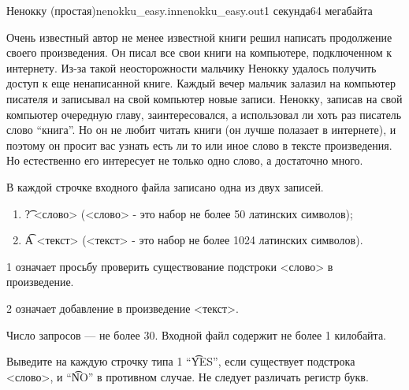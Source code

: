 
\begin{problem}{Ненокку (простая)}{nenokku\_easy.in}{nenokku\_easy.out}{1 секунда}{64 мегабайта}

Очень известный автор не менее известной книги решил написать 
продолжение своего произведения. 
Он писал все свои книги на компьютере, подключенном к интернету. 
Из-за такой неосторожности мальчику Ненокку удалось получить доступ к еще ненаписанной книге. 
Каждый вечер мальчик залазил на компьютер писателя и записывал на свой компьютер 
новые записи. Ненокку, записав на свой компьютер очередную главу, 
заинтересовался, а использовал ли хоть раз писатель слово ``книга''. 
Но он не любит читать книги (он лучше полазает в интернете), и поэтому 
он просит вас узнать есть ли то или иное слово в тексте произведения. 
Но естественно его интересует не только одно слово, а достаточно много.

\InputFile

В каждой строчке входного файла записано одна из двух записей.

\begin{enumerate}
\item \t{? <слово>} (<слово> - это набор не более 50 латинских символов);
\item \t{A <текст>} (<текст> - это набор не более 1024 латинских символов).
\end{enumerate}

1 означает просьбу проверить существование подстроки <слово> в произведение.

2 означает добавление в произведение <текст>.

Число запросов --- не более 30. Входной файл содержит не более 1 килобайта. 

\OutputFile

Выведите на каждую строчку типа 1 ``\t{YES}'', если существует 
подстрока <слово>, и ``\t{NO}'' в противном случае. Не следует 
различать регистр букв.

\Example

\begin{example}%
%
\end{example}

\end{problem}
